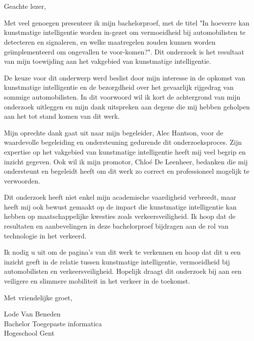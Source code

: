 
\chapter*{}%
\label{ch:voorwoord}
\setlength{\parskip}{1em}
Geachte lezer,

Met veel genoegen presenteer ik mijn bachelorproef, met de titel "In hoeverre kan kunstmatige intelligentie worden in-gezet om vermoeidheid bij automobilisten te detecteren en signaleren, en welke maatregelen zouden kunnen worden geïmplementeerd om ongevallen te voor-komen?".
Dit onderzoek is het resultaat van mijn toewijding aan het vakgebied van kunstmatige intelligentie.

De keuze voor dit onderwerp werd beslist door mijn interesse in de opkomst van kunstmatige intelligentie en de bezorgdheid over het gevaarlijk rijgedrag van sommige automobilisten. In dit voorwoord
wil ik kort de achtergrond van mijn onderzoek uitleggen en mijn dank uitspreken aan degene die mij hebben geholpen aan het tot stand komen van dit werk.

Mijn oprechte dank gaat uit naar mijn begeleider, Alec Hantson, voor de waardevolle begeleiding en ondersteuning gedurende dit onderzoeksproces. Zijn expertise op het vakgebied van kunstmatige intelligentie heeft mij veel begrip en inzicht gegeven.
Ook wil ik mijn promotor, Chloé De Leenheer, bedanken die mij ondersteunt en begeleidt heeft om dit werk zo correct en professioneel mogelijk te verwoorden.

Dit onderzoek heeft niet enkel mijn academische vaardigheid verbreedt, maar heeft mij ook bewust gemaakt op de impact die kunstmatige intelligentie kan hebben op maatschappelijke kwesties zoals verkeersveiligheid.
Ik hoop dat de resultaten en aanbevelingen in deze bachelorproef bijdragen aan de rol van technologie in het verkeerd.

Ik nodig u uit om de pagina's van dit werk te verkennen en hoop dat dit u een inzicht geeft in de relatie tussen kunstmatige intelligentie, vermoeidheid bij automobilisten en verkeersveiligheid.
Hopelijk draagt dit onderzoek bij aan een veiligere en slimmere mobiliteit in het verkeer in de toekomst.

Met vriendelijke groet,

Lode Van Beneden
\\
Bachelor Toegepaste informatica
\\
Hogeschool Gent